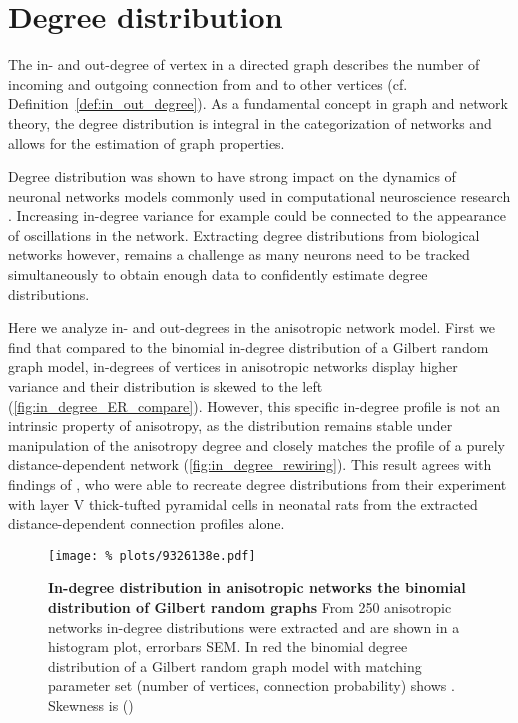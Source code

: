 
\section{Degree distribution}\label{sec:degree_distribution}

The in- and out-degree of vertex in a directed graph describes the
number of incoming and outgoing connection from and to other vertices
(cf. Definition~\ref{def:in_out_degree}). As a fundamental concept in
graph and network theory, the degree distribution is integral in the
categorization of networks and allows for the estimation of graph
properties.

Degree distribution was shown to have strong impact on the dynamics of
neuronal networks models commonly used in computational neuroscience
research \parencite{Roxin2011}. Increasing in-degree variance for
example could be connected to the appearance of oscillations in the
network. Extracting degree distributions from biological networks
however, remains a challenge as many neurons need to be tracked
simultaneously to obtain enough data to confidently estimate degree
distributions. 

Here we analyze in- and out-degrees in the anisotropic network
model. First we find that compared to the binomial in-degree
distribution of a Gilbert random graph model, in-degrees of vertices
in anisotropic networks display higher variance and their distribution
is skewed to the left (\autoref{fig:in_degree_ER_compare}). However,
this specific in-degree profile is not an intrinsic property of
anisotropy, as the distribution remains stable under manipulation of
the anisotropy degree and closely matches the profile of a purely
distance-dependent network (\autoref{fig:in_degree_rewiring}). This
result agrees with findings of \textcite[Fig. S3]{Perin2011}, who were
able to recreate degree distributions from their experiment with layer
V thick-tufted pyramidal cells in neonatal rats from the extracted
distance-dependent connection profiles alone.

\begin{figure}[H]
  \centering
  \texttt{[image: \%
    plots/9326138e.pdf]}
  \caption{\textbf{In-degree distribution in anisotropic networks the
      binomial distribution of Gilbert random graphs} From 250
    anisotropic networks in-degree distributions were extracted and
    are shown in a histogram plot, errorbars SEM. In red the binomial
    degree distribution of a Gilbert random graph model with matching
    parameter set (number of vertices, connection probability) shows
    . Skewness is ()}
  \label{fig:in_degree_ER_compare}
\end{figure}

